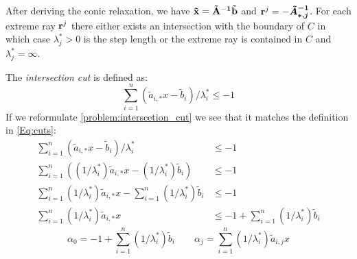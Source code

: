 After deriving the conic relaxation, we have $\bold{\tilde x} = \bold{\tilde A^{-1} \tilde b}$ and $\bold r^j= - \boldsymbol{\tilde A^{-1}_{*,j}}$. For each extreme ray $\bold r^j$ there either exists an intersection with the boundary of $C$ in which case $\lambda^*_j > 0$ is the step length or the extreme ray is contained in $C$ and $\lambda^*_j= \infty$. 

The \textit{intersection cut} is defined as:
\begin{equation} \label{Eq:interscetion_cut}
    \sum_{i=1}^n (\tilde a_{i,*}x - \tilde b_i)/ \lambda_i^* \leq -1
\end{equation}
If we reformulate \cref{problem:interscetion_cut} we see that it matches the definition in \cref{Eq:cuts}:
\begin{align}
    \sum_{i=1}^n (\tilde a_{i,*}x - \tilde b_i)/ \lambda_i^* &\leq -1 \\
    \sum_{i=1}^n ((1/ \lambda_i^*)\tilde a_{i,*}x - (1/ \lambda_i^*)\tilde b_i) &\leq -1 \\ 
    \sum_{i=1}^n (1/ \lambda_i^*)\tilde a_{i,*}x - \sum_{i=1}^n  (1/ \lambda_i^*)\tilde b_i &\leq -1 \\
    \sum_{i=1}^n (1/ \lambda_i^*)\tilde a_{i,*}x & \leq -1 + \sum_{i=1}^n  (1/ \lambda_i^*)\tilde b_i
\end{align}
\begin{equation*}
    \alpha_0 = -1 + \sum_{i=1}^n  (1/ \lambda_i^*)\tilde b_i \quad \quad \alpha_j = \sum_{i=1}^n (1/ \lambda_i^*)\tilde a_{i,j}x
\end{equation*} 

\cite{bienstock_outer_product_free_sets}

